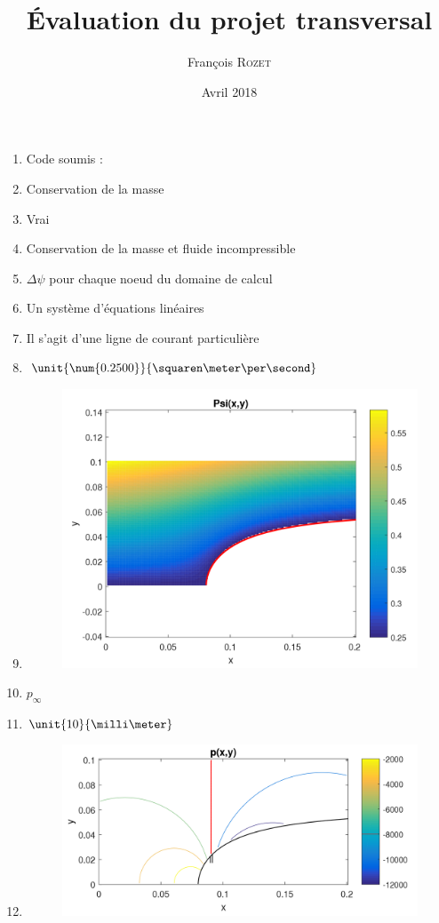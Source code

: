 \documentclass[a4paper, 12pt]{article}
\title{\'{E}valuation du projet transversal}
\author{François \textsc{Rozet}}
\date{Avril 2018}
\begin{document}
	\maketitle
	\begin{enumerate}[label=Q\arabic*.]
		\item Code soumis : \par
		
		\item Conservation de la masse
		\item Vrai
		\item Conservation de la masse et fluide incompressible
		\item $\Delta\psi$ pour chaque noeud du domaine de calcul
		\item Un système d'équations linéaires
		\item Il s'agit d'une ligne de courant particulière
		\item $\unit{\num{0.2500}}{\squaren\meter\per\second}$
		\item \textrm{ }
		 \begin{figure}[H]
		 	\centering
		 	\includegraphics[scale = 0.4]{resources/png/Q9.png}
		 \end{figure}
		\item $p_\infty$
		\item $\unit{10}{\milli\meter}$
		\item \textrm{ }
		\begin{figure}[H]
			\centering
			\includegraphics[scale = 0.4]{resources/png/Q12.png}

\end{figure}
\end{enumerate}
\end{document}

